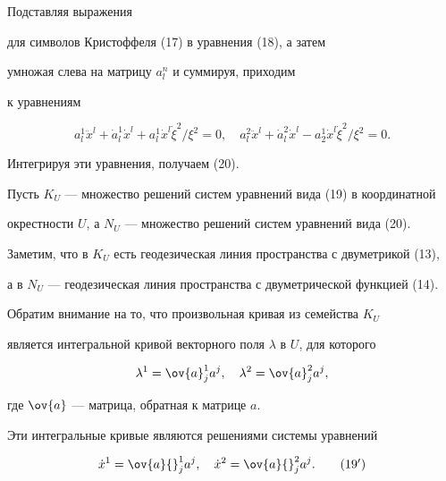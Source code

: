 \begin{pf}


Подставляя выражения


для символов Кристоффеля (17) в уравнения (18), а затем


умножая слева на матрицу $a^n_l$ и суммируя, приходим


к уравнениям


$$


a^1_l\ddot{x}^l+ \Dot{a}_l^1\Dot{x}^l +


a^1_l\Dot{x}^l\Dot{\xi}^2/\xi^2=0,\quad


a^2_l\ddot{x}^l+ \Dot{a}_l^2\Dot{x}^l -


a^1_2\Dot{x}^l\Dot{\xi}^2/\xi^2=0.


$$


Интегрируя эти уравнения, получаем (20).


\end{pf}





Пусть $K_U$ --- множество решений систем уравнений вида (19) в координатной


окрестности $U$, а $N_U$ --- множество решений систем уравнений вида (20).


Заметим, что в $K_U$ есть геодезическая линия пространства с двуметрикой (13),


а в $N_U$ --- геодезическая линия пространства с двуметрической функцией (14).


Обратим внимание на то, что произвольная кривая из семейства $K_U$


является интегральной кривой векторного поля $\lambda$ в $U$, для которого


\begin{equation}


\lambda^1=\ov{a}^1_ja^j,\quad \lambda^2=\ov{a}^2_ja^j,


\end{equation}


где $\ov{a}$ --- матрица, обратная к матрице $a$.


Эти интегральные кривые являются решениями системы уравнений


\begin{equation}


\Dot{x}^1=\ov{a}{}^1_ja^j,\quad 


\Dot{x}^2=\ov{a}{}^2_ja^j.\tag{$19'$}


\end{equation}


